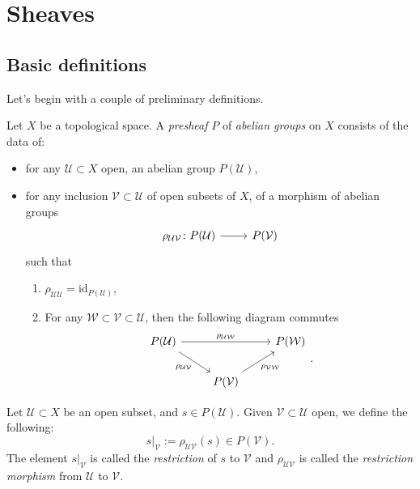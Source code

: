\documentclass[../Main]{subfiles}
\begin{document}
\section{Sheaves}
\subsection{Basic definitions}
Let's begin with a couple of preliminary definitions.
\begin{defn}[Presheaf]
	Let $X$ be a topological space.
	A {\em presheaf} $P$ of {\em abelian groups} on $X$ consists of the data of:
	\begin{itemize}
		\item for any $\mathcal{U} \subset X$ open, an abelian group $P(\mathcal{U})$,
		\item for any inclusion $\mathcal{V} \subset \mathcal{U}$ of open
			subsets of $X$, of a morphism of abelian groups
			\begin{equation}
				\begin{tikzcd}
					\rho_{\mathcal{UV}}\colon P(\mathcal{U}) \arrow[r, "", rightarrow] &
					P(\mathcal{V})
				\end{tikzcd}
			\end{equation} 
			such that
			\begin{enumerate}
				\item $\rho_{\mathcal{U}\mathcal{U}} = \mathrm{id}_{P(\mathcal{U})}$,
				\item For any $\mathcal{W} \subset \mathcal{V} \subset \mathcal{U}$,
					then the following diagram commutes
					\begin{equation}
					\begin{tikzcd}
						P(\mathcal{U}) \arrow[rr, "\rho_{\mathcal{U}\mathcal{W}}", rightarrow] 
						\arrow[rd, "\rho_{\mathcal{U}\mathcal{V}}"', rightarrow] & &
						P(\mathcal{W})\\
						&
						P(\mathcal{V}) \arrow[ru, "\rho_{\mathcal{V}\mathcal{W}}"', rightarrow] &
					\end{tikzcd}
					.\end{equation} 
			\end{enumerate}
	\end{itemize}
\end{defn}

\begin{ntt}[Restriction]
	Let $\mathcal{U} \subset X$ be an open subset, and $s \in P(\mathcal{U})$.
	Given $\mathcal{V} \subset \mathcal{U}$ open, we define the following: 
	\begin{equation}
		\left.s\right|_{\mathcal{V}} := \rho_{\mathcal{UV}}(s) \in P(\mathcal{V})
	.\end{equation} 
	The element $\left.s\right|_{\mathcal{V}}$ is called the {\em restriction} of $s$ to $\mathcal{V}$
	and $\rho_{\mathcal{UV}}$ is called the {\em restriction morphism} from $\mathcal{U}$
	to $\mathcal{V}$.
\end{ntt}
\end{document}
